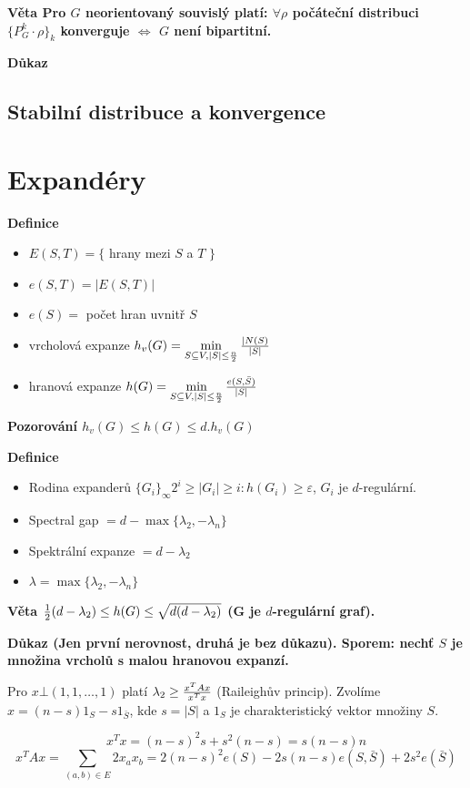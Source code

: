 \documentclass[a4paper,12pt,titlepage]{article}
\newcommand{\dk}{\smallskip\noindent\bf Důkaz\rm{} }
\newcommand{\df}{\smallskip\noindent\bf Definice\rm{} }
\newcommand{\vt}{\smallskip\noindent\bf Věta\rm{} }
\newcommand{\poz}{\smallskip\noindent\bf Pozorování\rm{} }
\begin{document}
\vt Pro $G$ neorientovaný souvislý platí: $\forall \rho$ počáteční distribuci $\{P_G^k\cdot \rho\}_k$ konverguje $\Leftrightarrow$ $G$ není bipartitní.

\dk



\subsection{Stabilní distribuce a konvergence}

\section{Expandéry}

\df
\begin{itemize}
	\item $E(S,T) = \{$ hrany mezi $S$ a $T$ $\}$
	\item $e(S,T) = |E(S,T)|$
	\item $e(S) = $ počet hran uvnitř $S$
	\item vrcholová expanze $h_v(G) = \min\limits_{S\subseteq V, |S|\le {n\over 2}} {|N(S) \over |S|}$
	\item hranová expanze $h(G) = \min\limits_{S\subseteq V, |S|\le {n\over 2}} {e(S,\bar S) \over |S|}$
\end{itemize}

\poz $h_v(G) \le h(G) \le d . h_v(G)$

\df 
\begin{itemize}
	\item Rodina expanderů $\{G_i\}_\infty$\quad$2^i \ge |G_i| \ge i: h(G_i) \ge \varepsilon$, $G_i$ je $d$-regulární.
	\item Spectral gap $= d - \max\{\lambda_2,-\lambda_n\}$
	\item Spektrální expanze $= d - \lambda_2$
	\item $\lambda = \max\{\lambda_2,-\lambda_n\}$
\end{itemize}

\vt ${1\over 2}(d-\lambda_2) \le h(G) \le \sqrt{d(d-\lambda_2)}$ (G je $d$-regulární graf).

\dk (Jen první nerovnost, druhá je bez důkazu). Sporem: nechť $S$ je množina
vrcholů s malou hranovou expanzí.

Pro $x \bot (1,1,\dots,1)$ platí $\lambda_2 \ge {x^TAx\over x^Tx}$ (Raileighův
princip). Zvolíme $x = (n-s)1_S - s1_{\bar S}$, kde $s = |S|$ a $1_S$ je
charakteristický vektor množiny $S$.

$$x^Tx = (n-s)^2s + s^2(n-s) = s(n-s)n$$
$$x^TAx = \sum_{(a,b)\in E} 2x_ax_b = 2(n-s)^2e(S)-2s(n-s)e(S,\bar S) + 2s^2e(\bar S)$$
\end{document}
